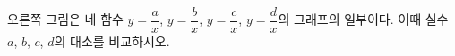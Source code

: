 \noindent\begin{minipage}[t]{0.58\linewidth}\vspace{0pt}\raggedright 오른쪽 그림은 네 함수 $y=\dfrac{a}{x}$, $y=\dfrac{b}{x}$, $y=\dfrac{c}{x}$, $y=\dfrac{d}{x}$의 그래프의 일부이다. 이때 실수 $a$, $b$, $c$, $d$의 대소를 비교하시오.\end{minipage}\hfill\begin{minipage}[t]{0.4\linewidth}\vspace{0pt}\centering \resizebox{\ifdim\width>\linewidth\linewidth\else\width\fi}{!}{}\end{minipage}\par
